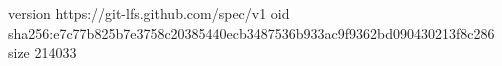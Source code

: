version https://git-lfs.github.com/spec/v1
oid sha256:e7c77b825b7e3758c20385440ecb3487536b933ac9f9362bd090430213f8c286
size 214033
